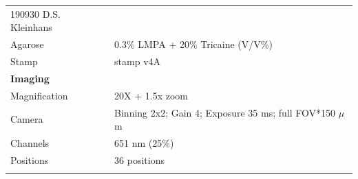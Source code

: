 \documentclass[11pt,singlespacinge,twoside]{reedthesis} %
\begin{document}
\begin{longtable}[]{@{}ll@{}}
\begin{minipage}[t]{0.73\columnwidth}
190930 D.S. Kleinhans\strut
\end{minipage}\tabularnewline
\begin{minipage}[t]{0.21\columnwidth}\raggedright
Agarose\strut
\end{minipage} & \begin{minipage}[t]{0.73\columnwidth}\raggedright
0.3\% LMPA + 20\% Tricaine (V/V\%)\strut
\end{minipage}\tabularnewline
\begin{minipage}[t]{0.21\columnwidth}\raggedright
Stamp\strut
\end{minipage} & \begin{minipage}[t]{0.73\columnwidth}\raggedright
stamp v4A\strut
\end{minipage}\tabularnewline
\begin{minipage}[t]{0.21\columnwidth}\raggedright
\textbf{Imaging}\strut
\end{minipage} & \begin{minipage}[t]{0.73\columnwidth}\raggedright
\strut
\end{minipage}\tabularnewline
\begin{minipage}[t]{0.21\columnwidth}\raggedright
Magnification\strut
\end{minipage} & \begin{minipage}[t]{0.73\columnwidth}\raggedright
20X + 1.5x zoom\strut
\end{minipage}\tabularnewline
\begin{minipage}[t]{0.21\columnwidth}\raggedright
Camera\strut
\end{minipage} & \begin{minipage}[t]{0.73\columnwidth}\raggedright
Binning 2x2; Gain 4; Exposure 35 ms; full FOV*150 \(\mu\)m\strut
\end{minipage}\tabularnewline
\begin{minipage}[t]{0.21\columnwidth}\raggedright
Channels\strut
\end{minipage} & \begin{minipage}[t]{0.73\columnwidth}\raggedright
651 nm (25\%)\strut
\end{minipage}\tabularnewline
\begin{minipage}[t]{0.21\columnwidth}\raggedright
Positions\strut
\end{minipage} & \begin{minipage}[t]{0.73\columnwidth}\raggedright
36 positions\strut
\end{minipage}\tabularnewline
\begin{minipage}[t]{0.21\columnwidth}\raggedright

\end{minipage}
\end{longtable}
\end{document}
